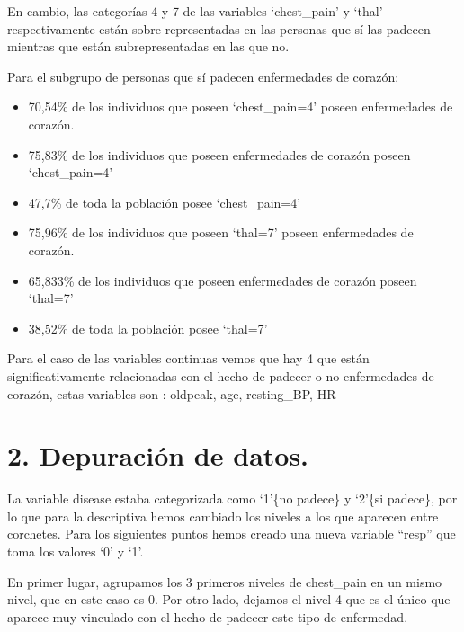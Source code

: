 \documentclass[]{article}
\newenvironment{Shaded}{\begin{snugshade}}{\end{snugshade}}
\newcommand{\KeywordTok}[1]{\textcolor[rgb]{0.13,0.29,0.53}{\textbf{#1}}}
\newcommand{\DecValTok}[1]{\textcolor[rgb]{0.00,0.00,0.81}{#1}}
\newcommand{\StringTok}[1]{\textcolor[rgb]{0.31,0.60,0.02}{#1}}
\newcommand{\OperatorTok}[1]{\textcolor[rgb]{0.81,0.36,0.00}{\textbf{#1}}}
\newcommand{\NormalTok}[1]{#1}
\begin{document}
En cambio, las categorías 4 y 7 de las variables `chest\_pain' y `thal'
respectivamente están sobre representadas en las personas que sí las
padecen mientras que están subrepresentadas en las que no.

Para el subgrupo de personas que sí padecen enfermedades de corazón:

\begin{itemize}
\item
  70,54\% de los individuos que poseen `chest\_pain=4' poseen
  enfermedades de corazón.
\item
  75,83\% de los individuos que poseen enfermedades de corazón poseen
  `chest\_pain=4'
\item
  47,7\% de toda la población posee `chest\_pain=4'
\item
  75,96\% de los individuos que poseen `thal=7' poseen enfermedades de
  corazón.
\item
  65,833\% de los individuos que poseen enfermedades de corazón poseen
  `thal=7'
\item
  38,52\% de toda la población posee `thal=7'
\end{itemize}

Para el caso de las variables continuas vemos que hay 4 que están
significativamente relacionadas con el hecho de padecer o no
enfermedades de corazón, estas variables son : oldpeak, age,
resting\_BP, HR

\section{2. Depuración de datos.}\label{depuracion-de-datos.}

La variable disease estaba categorizada como `1'\{no padece\} y `2'\{si
padece\}, por lo que para la descriptiva hemos cambiado los niveles a
los que aparecen entre corchetes. Para los siguientes puntos hemos
creado una nueva variable ``resp'' que toma los valores `0' y `1'.

En primer lugar, agrupamos los 3 primeros niveles de chest\_pain en un
mismo nivel, que en este caso es 0. Por otro lado, dejamos el nivel 4
que es el único que aparece muy vinculado con el hecho de padecer este
tipo de enfermedad.

\begin{Shaded}
\end{Shaded}
\end{document}
